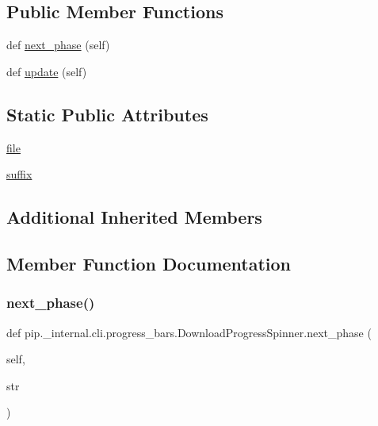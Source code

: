 \subsection*{Public Member Functions}
\begin{DoxyCompactItemize}
\item 
def \hyperlink{classpip_1_1__internal_1_1cli_1_1progress__bars_1_1DownloadProgressSpinner_a8f5e7dcb2e9cb3073a3e428c7814a277}{next\+\_\+phase} (self)
\item 
def \hyperlink{classpip_1_1__internal_1_1cli_1_1progress__bars_1_1DownloadProgressSpinner_ad89eb5dd5b755a1716693ee57534a5ff}{update} (self)
\end{DoxyCompactItemize}
\subsection*{Static Public Attributes}
\begin{DoxyCompactItemize}
\item 
\hyperlink{classpip_1_1__internal_1_1cli_1_1progress__bars_1_1DownloadProgressSpinner_a433576612719fba7d1e06a323408b124}{file}
\item 
\hyperlink{classpip_1_1__internal_1_1cli_1_1progress__bars_1_1DownloadProgressSpinner_a11d99fbb91f7f99e4be17e419cd5b8a1}{suffix}
\end{DoxyCompactItemize}
\subsection*{Additional Inherited Members}


\subsection{Member Function Documentation}
\mbox{\label{classpip_1_1__internal_1_1cli_1_1progress__bars_1_1DownloadProgressSpinner_a8f5e7dcb2e9cb3073a3e428c7814a277}} 
\subsubsection{\texorpdfstring{next\+\_\+phase()}{next\_phase()}}
{\footnotesize\ttfamily def pip.\+\_\+internal.\+cli.\+progress\+\_\+bars.\+Download\+Progress\+Spinner.\+next\+\_\+phase (\begin{DoxyParamCaption}\item[{}]{self,  }\item[{}]{str }\end{DoxyParamCaption})}

